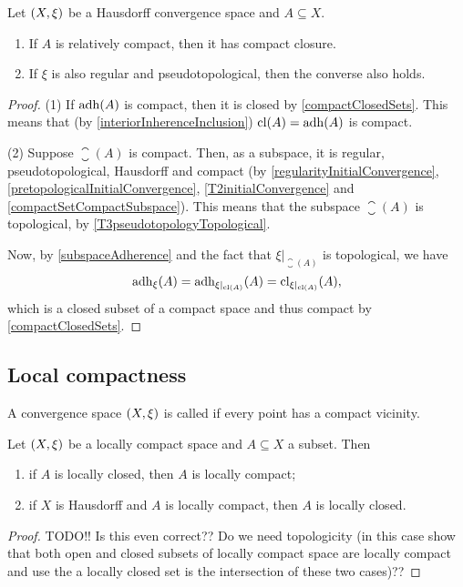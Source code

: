 \begin{proposition}
Let $\sSet{X,\xi}$ be a Hausdorff convergence space and $A\subseteq X$.
\begin{enumerate}
\item If $A$ is relatively compact, then it has compact closure.
\item If $\xi$ is also regular and pseudotopological, then the converse also holds.
\end{enumerate}
\end{proposition}
\begin{proof}
(1) If $\operatorname{adh}(A)$ is compact, then it is closed by \ref{compactClosedSets}. This means that (by \ref{interiorInherenceInclusion}) $\operatorname{cl}(A) = \operatorname{adh}(A)$ is compact.

(2) Suppose $\closure(A)$ is compact. Then, as a subspace, it is regular, pseudotopological, Hausdorff and compact (by \ref{regularityInitialConvergence}, \ref{pretopologicalInitialConvergence}, \ref{T2initialConvergence} and \ref{compactSetCompactSubspace}). This means that the subspace $\closure(A)$ is topological, by \ref{T3pseudotopologyTopological}.

Now, by \ref{subspaceAdherence} and the fact that $\xi|_{\closure(A)}$ is topological, we have
\[ \operatorname{adh}_\xi(A) = \operatorname{adh}_{\xi|_{\operatorname{cl}(A)}}(A) = \operatorname{cl}_{\xi|_{\operatorname{cl}(A)}}(A), \]
which is a closed subset of a compact space and thus compact by \ref{compactClosedSets}.
\end{proof}

\subsection{Local compactness}
\begin{definition}
A convergence space $\sSet{X, \xi}$ is called  if every point has a compact vicinity.
\end{definition}

\begin{proposition} \label{locallyCompactSubspace}
Let $\sSet{X,\xi}$ be a locally compact space and $A\subseteq X$ a subset. Then
\begin{enumerate}
\item if $A$ is locally closed, then $A$ is locally compact;
\item if $X$ is Hausdorff and $A$ is locally compact, then $A$ is locally closed.
\end{enumerate}
\end{proposition}
\begin{proof}
TODO!! Is this even correct?? Do we need topologicity (in this case show that both open and closed subsets of locally compact space are locally compact and use the a locally closed set is the intersection of these two cases)??
\end{proof}

